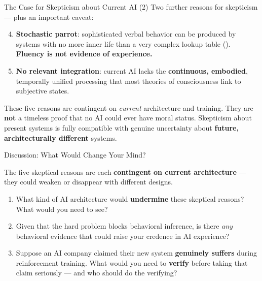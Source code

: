 \documentclass[aspectratio=169,11pt]{beamer}
\begin{document}
\begin{frame}[shrink=5]{The Case for Skepticism about Current AI (2)}
Two further reasons for skepticism --- plus an important caveat:

\vspace{0.1cm}
\begin{enumerate}
    \setcounter{enumi}{3}
    \item \textbf{Stochastic parrot}: sophisticated verbal behavior can be produced by systems with no more inner life than a very complex lookup table (\textcite{dennett_consciousness}). \textbf{Fluency is not evidence of experience.}

    \vspace{0.1cm}
    \item \textbf{No relevant integration}: current AI lacks the \textbf{continuous, embodied}, temporally unified processing that most theories of consciousness link to subjective states.
\end{enumerate}

\vspace{0.15cm}
\begin{probox}
\small
These five reasons are contingent on \emph{current} architecture and training. They are \textbf{not} a timeless proof that no AI could ever have moral status. Skepticism about present systems is fully compatible with genuine uncertainty about \textbf{future, architecturally different} systems.
\end{probox}
\end{frame}

\begin{frame}{Discussion: What Would Change Your Mind?}
\begin{discussionbox}[Discussion]
\small
The five skeptical reasons are each \textbf{contingent on current architecture} --- they could weaken or disappear with different designs.
\begin{enumerate}
    \item What kind of AI architecture would \textbf{undermine} these skeptical reasons? What would you need to see?
    \item Given that the hard problem blocks behavioral inference, is there \emph{any} behavioral evidence that could raise your credence in AI experience?
    \item Suppose an AI company claimed their new system \textbf{genuinely suffers} during reinforcement training. What would you need to \textbf{verify} before taking that claim seriously --- and who should do the verifying?
\end{enumerate}
\end{discussionbox}
\end{frame}
\end{document}
